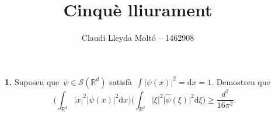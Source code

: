 \documentclass[a4paper]{article}
\title{Cinquè lliurament}
\author{Claudi Lleyda Moltó -- 1462908}
\theoremstyle{plain}
\theoremstyle{definition}
\providecommand{\uppi}{\pi}
\newcommand{\diff}{\mathrm{d}}
\newcommand{\abs}[1]{\lvert{#1}\rvert}
\newcommand{\Sc}{\mathcal{S}}
\newcommand{\RR}{\mathbb{R}}
\begin{document}
\maketitle

\begin{enumerate}
    \item[\textbf{1.}] Suposeu que~\(\psi\in\Sc(\RR^{d})\)
        satisfà~\(\int\abs{\psi(x)}^{2}=\diff x=1\). Demostreu que
        \[
            \biggl(\int_{\RR^{d}}\abs{x}^{2}\abs{\psi(x)}^{2}\diff x\biggr)
            \biggl(\int_{\RR^{d}}\abs{\xi}^{2}\abs{\widehat{\psi}(\xi)}^{2}\diff\xi\biggr)
            \geq
            \frac{d^{2}}{16\uppi^{2}}.
        \]
\end{enumerate}
\end{document}
